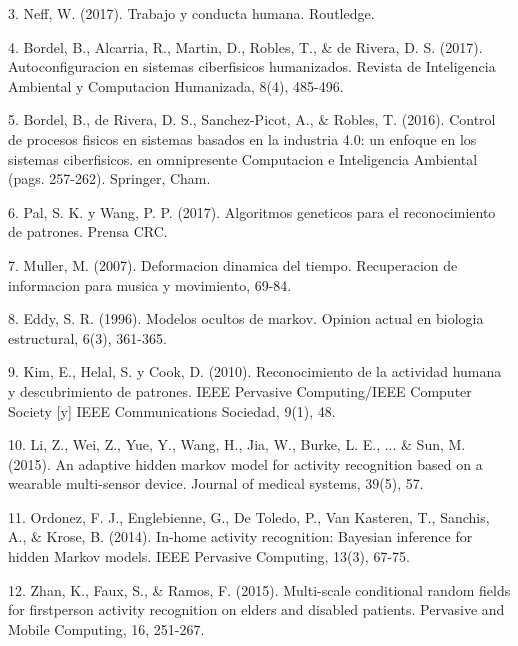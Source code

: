 \documentclass{paper}
\begin{document}
\bigskip
\bigskip

3. Neff, W. (2017). Trabajo y conducta humana. Routledge.

\bigskip
\bigskip

4. Bordel, B., Alcarria, R., Martin, D., Robles, T., & de Rivera, D. S. (2017). Autoconfiguracion en sistemas ciberfisicos humanizados. Revista de Inteligencia Ambiental y Computacion Humanizada, 8(4), 485-496.

\bigskip
\bigskip

5. Bordel, B., de Rivera, D. S., Sanchez-Picot, A., & Robles, T. (2016). Control de procesos fisicos en sistemas basados en la industria 4.0: un enfoque en los sistemas ciberfisicos. en omnipresente
Computacion e Inteligencia Ambiental (pags. 257-262). Springer, Cham.

\bigskip
\bigskip

6. Pal, S. K. y Wang, P. P. (2017). Algoritmos geneticos para el reconocimiento de patrones. Prensa CRC.

\bigskip
\bigskip


7. Muller, M. (2007). Deformacion dinamica del tiempo. Recuperacion de informacion para musica y movimiento, 69-84.

\bigskip
\bigskip

8. Eddy, S. R. (1996). Modelos ocultos de markov. Opinion actual en biologia estructural, 6(3), 361-365.

\bigskip
\bigskip


9. Kim, E., Helal, S. y Cook, D. (2010). Reconocimiento de la actividad humana y descubrimiento de patrones. IEEE Pervasive Computing/IEEE Computer Society [y] IEEE Communications
Sociedad, 9(1), 48.

\bigskip
\bigskip

10. Li, Z., Wei, Z., Yue, Y., Wang, H., Jia, W., Burke, L. E., ... & Sun, M. (2015). An adaptive hidden markov model for activity recognition based on a wearable multi-sensor device. Journal of medical systems, 39(5), 57.

\bigskip
\bigskip

11. Ordonez, F. J., Englebienne, G., De Toledo, P., Van Kasteren, T., Sanchis, A., & Krose, B. (2014). In-home activity recognition: Bayesian inference for hidden Markov models. IEEE Pervasive Computing, 13(3), 67-75.

\bigskip
\bigskip

12. Zhan, K., Faux, S., & Ramos, F. (2015). Multi-scale conditional random fields for firstperson activity recognition on elders and disabled patients. Pervasive and Mobile Computing, 16, 251-267.
\end{document}
